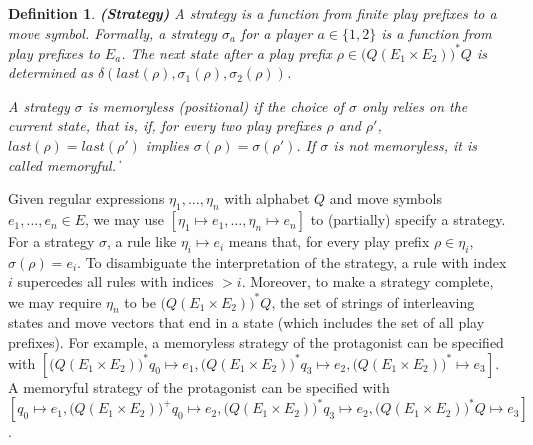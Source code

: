 \documentclass[times,10pt,twocolumn]{article}
\newtheorem{definition}{Definition}
\newcommand\qed{\hfill\ensuremath{\Box}}
\newcommand{\emlast}{\textit{last}}
\def\qed{\ifmmode\|\else{\unskip\nobreak\hfil
\penalty50\hskip1em\null\nobreak\hfil$\blacksquare$
\parfillskip=0pt\finalhyphendemerits=0\endgraf}\fi}
\begin{document}
\begin{definition} \label{def.strategy} 
\textbf{(Strategy)}
A {\em strategy} is a function from finite play prefixes to 
a move symbol.  
Formally, a strategy $\sigma_a$ for a player $a\in\{1,2\}$ \label{reply1.grammar.strategy} 
is a function from play prefixes to $E_a$.  
The next state after a play prefix $\rho\in \big(Q(E_1 \times E_2)\big)^*Q$ 
\label{reply1.Q.cup}
is determined as 
$\delta(\emlast(\rho),\sigma_1(\rho),\sigma_2(\rho))$. 

A strategy $\sigma$ is {\em memoryless} ({\em positional}) if 
the choice of $\sigma$ only relies on the current state, 
that is, if, for every two play prefixes $\rho$ and $\rho'$, 
$\emlast(\rho)=\emlast(\rho')$ implies $\sigma(\rho)=\sigma(\rho')$.
If $\sigma$ is not memoryless, it is called {\em memoryful}. 
\qed
\end{definition}

Given regular expressions \cite{HU79} 
$\eta_1,\ldots,\eta_n$\label{reply.epsilon.empty}  
with alphabet $Q$ and move symbols $e_1,\ldots,e_n\in E$, 
we may use $[\eta_1\mapsto e_1,\ldots,\eta_n\mapsto e_n]$ to
(partially) specify a strategy.  
\label{reply1.Supposedly}
For a strategy $\sigma$, a rule like $\eta_i\mapsto e_i$ means 
that, for every play prefix $\rho\in \eta_i$, $\sigma(\rho)=e_i$. 
To disambiguate the interpretation of the strategy, 
a rule with index $i$ supercedes all rules with indices $>i$. 
Moreover, to make a strategy complete, we may require  
$\eta_n$ to be $\big(Q(E_1 \times E_2)\big)^*Q$, the set of strings of interleaving states and move vectors that end in a state (which includes the set of all play prefixes).    
For example, 
a memoryless strategy of the protagonist\label{reply2.the.protagonist} 
can be specified with  
$[\big(Q(E_1 \times E_2)\big)^*q_0\mapsto e_1, \big(Q(E_1 \times E_2)\big)^*q_3 \mapsto e_2, \big(Q(E_1 \times E_2)\big)^*\mapsto e_3]$. 
A memoryful strategy of the protagonist can be specified with  \label{reply1.V2Q} 
$[q_0\mapsto e_1,\big(Q(E_1 \times E_2)\big)^+q_0\mapsto e_2,\big(Q(E_1 \times E_2)\big)^*q_3\mapsto e_2, \big(Q(E_1 \times E_2)\big)^*Q\mapsto e_3]$.

\end{document}
